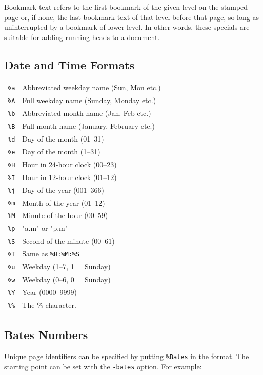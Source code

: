 \documentclass{book}
\begin{document}
Bookmark text refers to the first bookmark of the given level on the stamped page or, if none, the last bookmark text of that level before that page, so long as uninterrupted by a bookmark of lower level. In other words, these specials are suitable for adding running heads to a document.

  \subsection{Date and Time Formats}
  \begin{tabular}{ll}
    \texttt{\%a} & Abbreviated weekday name (Sun, Mon etc.)\\
    \texttt{\%A} & Full weekday name (Sunday, Monday etc.)\\
    \texttt{\%b} & Abbreviated month name (Jan, Feb etc.)\\
    \texttt{\%B} & Full month name (January, February etc.)\\
    \texttt{\%d} & Day of the month (01--31) \\
    \texttt{\%e} & Day of the month (1--31) \\
    \texttt{\%H} & Hour in 24-hour clock (00--23)\\
    \texttt{\%I} & Hour in 12-hour clock (01--12)\\
    \texttt{\%j} & Day of the year (001--366)\\
    \texttt{\%m} & Month of the year (01--12)\\
    \texttt{\%M} & Minute of the hour (00--59)\\
    \texttt{\%p} & "a.m" or "p.m"\\
    \texttt{\%S} & Second of the minute (00--61)\\
    \texttt{\%T} & Same as \texttt{\%H:\%M:\%S}\\
    \texttt{\%u} & Weekday (1--7, 1 = Sunday)\\
    \texttt{\%w} & Weekday (0--6, 0 = Sunday)\\
    \texttt{\%Y} & Year (0000--9999)\\
    \texttt{\%\%} & The \% character.
  \end{tabular}

  \subsection{Bates Numbers}
  Unique page identifiers can be specified by putting \verb!%Bates! in the format.
The starting point can be set with the \texttt{-bates} option. For example:
\end{document}
